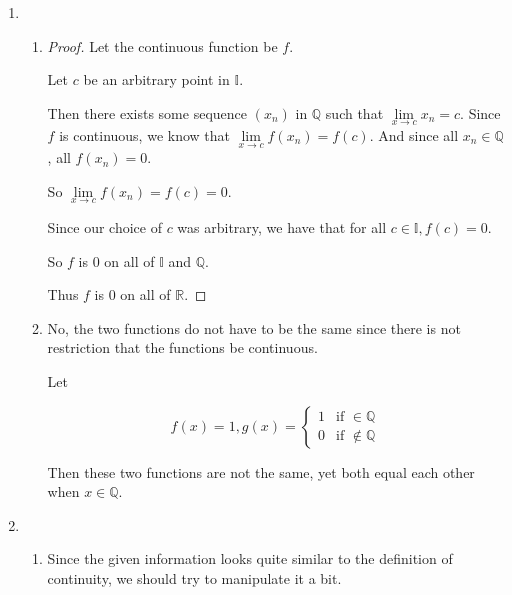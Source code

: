 \documentclass[12pt,letterpaper]{article}
\begin{document}
\begin{enumerate}[label=Exercise 4.3.\arabic*]
\begin{proof}
        So $\lim\limits_{x \to c} h(x_n) = h(c) = 0$.

        Since $h(c) = 0, c \in K$, so $K$ contains its limit points.

        Thus $K$ is a closed set.
      \end{proof}

    \item
      \begin{enumerate}
        \item
          \begin{proof}
            Let the continuous function be $f$.

            Let $c$ be an arbitrary point in $\mathbb{I}$.

            Then there exists some sequence $(x_n)$ in $\mathbb{Q}$ such that
            $\lim\limits_{x \to c} x_n = c$.
            Since $f$ is continuous, we know that $\lim\limits_{x \to c} f(x_n) = f(c)$.
            And since all $x_n \in \mathbb{Q}$, all $f(x_n) = 0$.

            So $\lim\limits_{x \to c} f(x_n) = f(c) = 0$.

            Since our choice of $c$ was arbitrary,
            we have that for all $c \in \mathbb{I}, f(c) = 0$.

            So $f$ is 0 on all of $\mathbb{I}$ and $\mathbb{Q}$.

            Thus $f$ is 0 on all of $\mathbb{R}$.
          \end{proof}
        \item
          No, the two functions do not have to be the same since there is not restriction that the functions be continuous.

          Let

          \[
            f(x) = 1,
            g(x) =
            \begin{cases}
              1 & \text{if } \in    \mathbb{Q} \\
              0 & \text{if } \notin \mathbb{Q}
            \end{cases}
          \]

          Then these two functions are not the same,
          yet both equal each other when $x \in \mathbb{Q}$.
      \end{enumerate}
    \item
      \begin{enumerate}
        \item
          Since the given information looks quite similar to the definition of continuity,
          we should try to manipulate it a bit.


\end{enumerate}
\end{enumerate}
\end{document}
